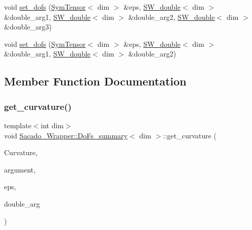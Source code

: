 \begin{DoxyCompactItemize}
\item 
void \hyperlink{classSacado__Wrapper_1_1DoFs__summary_a875597639efab9d48f47ea5b91b56271}{set\+\_\+dofs} (\hyperlink{classSacado__Wrapper_1_1SymTensor}{Sym\+Tensor}$<$ dim $>$ \&eps, \hyperlink{classSacado__Wrapper_1_1SW__double}{S\+W\+\_\+double}$<$ dim $>$ \&double\+\_\+arg1, \hyperlink{classSacado__Wrapper_1_1SW__double}{S\+W\+\_\+double}$<$ dim $>$ \&double\+\_\+arg2, \hyperlink{classSacado__Wrapper_1_1SW__double}{S\+W\+\_\+double}$<$ dim $>$ \&double\+\_\+arg3)
\item 
void \hyperlink{classSacado__Wrapper_1_1DoFs__summary_a1fa50906ae3965c47656a4bb3c781811}{set\+\_\+dofs} (\hyperlink{classSacado__Wrapper_1_1SymTensor}{Sym\+Tensor}$<$ dim $>$ \&eps, \hyperlink{classSacado__Wrapper_1_1SW__double}{S\+W\+\_\+double}$<$ dim $>$ \&double\+\_\+arg1, \hyperlink{classSacado__Wrapper_1_1SW__double}{S\+W\+\_\+double}$<$ dim $>$ \&double\+\_\+arg2)
\end{DoxyCompactItemize}


\subsection{Member Function Documentation}
\mbox{\label{classSacado__Wrapper_1_1DoFs__summary_adf29bfda10814ecee9572a4751d34db0}} 
\subsubsection{\texorpdfstring{get\+\_\+curvature()}{get\_curvature()}\hspace{0.1cm}{\footnotesize\ttfamily [1/2]}}
{\footnotesize\ttfamily template$<$int dim$>$ \\
void \hyperlink{classSacado__Wrapper_1_1DoFs__summary}{Sacado\+\_\+\+Wrapper\+::\+Do\+Fs\+\_\+summary}$<$ dim $>$\+::get\+\_\+curvature (\begin{DoxyParamCaption}\item[{Symmetric\+Tensor$<$ 2, dim $>$ \&}]{Curvature,  }\item[{Sacado\+::\+Fad\+::\+D\+Fad$<$ \hyperlink{Sacado__Wrapper_8h_a7e0893207b87dad05c66a34baac8ed2e}{D\+Fad\+Type} $>$ \&}]{argument,  }\item[{\hyperlink{classSacado__Wrapper_1_1SymTensor2}{Sym\+Tensor2}$<$ dim $>$ \&}]{eps,  }\item[{\hyperlink{classSacado__Wrapper_1_1SW__double2}{S\+W\+\_\+double2}$<$ dim $>$ \&}]{double\+\_\+arg }\end{DoxyParamCaption})}



